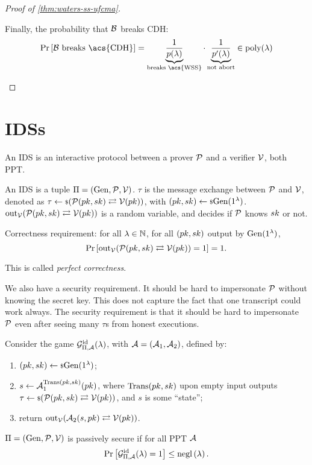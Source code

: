 \begin{proof}[Proof of \cref{thm:waters-ss-ufcma}]
\begin{itemize}
			Finally, the probability that $\B$ breaks \ac{CDH}:
			\begin{equation*}
				\Pr{\B \text{ breaks \acs{CDH}}} = \underbrace{\frac{1}{p(\lambda)}}_{\text{breaks \acs{WSS}}} \cdot \underbrace{\frac{1}{p'(\lambda)}}_{\text{not abort}} \in \poly(\lambda)
			\end{equation*}
	\end{itemize}
\end{proof}

\section{\aclp{IDS}}

An \ac{IDS} is an interactive protocol between a prover $\P$ and a verifier $\V$, both \ac{PPT}.

\begin{definition}
	An \ac{IDS} is a tuple $\Pi = (\Gen, \P, \V)$.
	$\tau$ is the message exchange between $\P$ and $\V$, denoted as $\tau \rand{(\P(\pk,\sk) \toandfrom \V(\pk))}$, with $(\pk, \sk) \rand{\Gen(1^{\lambda})}$.
	$\mathrm{out}_{\V}(\P(\pk, \sk) \toandfrom \V(\pk))$ is a random variable, and decides if $\P$ knows $\sk$ or not.

	Correctness requirement: for all $\lambda \in \NaturalsZ$, for all $(\pk, \sk)$ output by $\Gen(1^{\lambda})$,
	\begin{equation*}
		\Pr{ \mathrm{out}_{\V} (\P(\pk, \sk) \toandfrom \V(\pk)) = 1} = 1.
	\end{equation*}
	This is called \emph{perfect correctness}.
\end{definition}
We also have a security requirement.
It should be hard to impersonate $\P$ without knowing the secret key.
This does not capture the fact that one transcript could work always.
The security requirement is that it should be hard to impersonate $\P$ even after seeing many $\tau$s from honest executions.

\begin{definition}
	Consider the game $\IDSGame(\lambda)$, with $\Adv = (\Adv_1, \Adv_2)$, defined by:
	\begin{enumerate}
		\item $(\pk, \sk) \rand{\Gen(1^{\lambda})}$;
		\item $s \from \Adv_1^{\Trans(\pk, \sk)}(\pk)$, where $\Trans(\pk, \sk)$ upon empty input outputs $\tau \rand{(\P(\pk, \sk) \toandfrom \V(\pk))}$, and $s$ is some ``state'';
		\item return $\mathrm{out}_{\V}(\Adv_2(s, \pk) \toandfrom \V(\pk))$.
	\end{enumerate}
	$\Pi = (\Gen, \P, \V)$ is passively secure if for all \ac{PPT} $\Adv$
	\begin{equation*}
		\Pr{ \IDSGame(\lambda) = 1 } \le \negl{\lambda}. \qedhere
	\end{equation*}
\end{definition}

